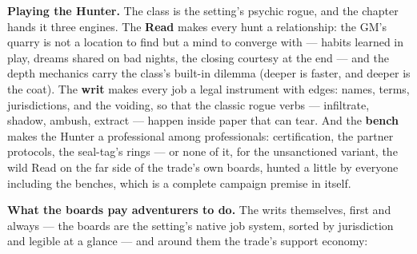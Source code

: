 \textbf{Playing the Hunter.} The class is the setting's psychic rogue, and the chapter hands it three engines. The \textbf{Read} makes every hunt a relationship: the GM's quarry is not a location to find but a mind to converge with --- habits learned in play, dreams shared on bad nights, the closing courtesy at the end --- and the depth mechanics carry the class's built-in dilemma (deeper is faster, and deeper is the coat). The \textbf{writ} makes every job a legal instrument with edges: names, terms, jurisdictions, and the voiding, so that the classic rogue verbs --- infiltrate, shadow, ambush, extract --- happen inside paper that can tear. And the \textbf{bench} makes the Hunter a professional among professionals: certification, the partner protocols, the seal-tag's rings --- or none of it, for the unsanctioned variant, the wild Read on the far side of the trade's own boards, hunted a little by everyone including the benches, which is a complete campaign premise in itself.

\textbf{What the boards pay adventurers to do.} The writs themselves, first and always --- the boards are the setting's native job system, sorted by jurisdiction and legible at a glance --- and around them the trade's support economy:

